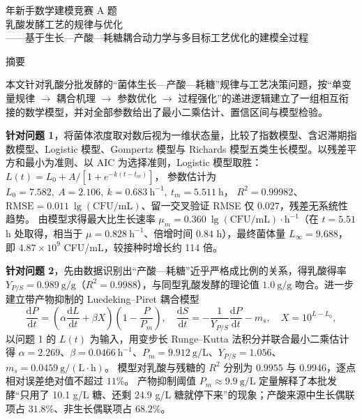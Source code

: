 \documentclass[12pt,a4paper]{ctexart}
\newcommand{\wj}[1]{\textbf{#1}}
\newcommand{\dd}{\mathrm{d}}
\begin{document}
\begin{center}
{ 年新手数学建模竞赛 \quad A 题}\\[0.5em]
{\heiti 乳酸发酵工艺的规律与优化}\\[0.6em]
{ ——基于生长—产酸—耗糖耦合动力学与多目标工艺优化的建模全过程}
\end{center}

\vspace{0.3em}

\begin{center}\heiti 摘\quad 要\end{center}

本文针对乳酸分批发酵的“菌体生长—产酸—耗糖”规律与工艺决策问题，按“单变量规律 $\to$ 耦合机理 $\to$ 参数优化 $\to$ 过程强化”的递进逻辑建立了一组相互衔接的数学模型，并对全部参数给出了最小二乘估计、置信区间与模型检验。

\wj{针对问题 1}，将菌体浓度取对数后视为一维状态量，比较了指数模型、含迟滞期指数模型、Logistic 模型、Gompertz 模型与 Richards 模型五类生长模型。以残差平方和最小为准则、以 AIC 为选择准则，Logistic 模型取胜：
$L(t)=L_0+A/[1+e^{-k(t-t_m)}]$，
参数估计为 $L_0=7.582,\ A=2.106,\ k=0.683\ \mathrm{h^{-1}},\ t_m=5.511\ \mathrm{h}$，
$R^2=0.99982$、$\mathrm{RMSE}=0.011\ \lg(\mathrm{CFU/mL})$、留一交叉验证 RMSE 仅 $0.027$，残差无系统性趋势。
由模型求得最大比生长速率 $\mu_m=0.360\ \lg(\mathrm{CFU/mL})\cdot\mathrm{h^{-1}}$（在 $t=5.51$ h 处取得，相当于 $\mu=0.828\ \mathrm{h^{-1}}$、倍增时间 $0.84$ h），最终菌体量 $L_\infty=9.688$，即 $4.87\times10^{9}$ CFU/mL，较接种时增长约 114 倍。

\wj{针对问题 2}，先由数据识别出“产酸—耗糖”近乎严格成比例的关系，得乳酸得率 $Y_{P/S}=0.989\ \mathrm{g/g}$（$R^2=0.9988$），与同型乳酸发酵的理论值 $1.0\ \mathrm{g/g}$ 吻合。进一步建立带产物抑制的 Luedeking--Piret 耦合模型
$$\frac{\dd P}{\dd t}=\left(\alpha\frac{\dd L}{\dd t}+\beta X\right)\left(1-\frac{P}{P_m}\right),\quad
\frac{\dd S}{\dd t}=-\frac{1}{Y_{P/S}}\frac{\dd P}{\dd t}-m_s,\quad X=10^{L-L_0},$$
以问题 1 的 $L(t)$ 为输入，用变步长 Runge--Kutta 法积分并联合最小二乘估计得
$\alpha=2.269$、$\beta=0.0466\ \mathrm{h^{-1}}$、$P_m=9.912\ \mathrm{g/L}$、$Y_{P/S}=1.056$、$m_s=0.0459\ \mathrm{g/(L\cdot h)}$。
模型对乳酸与残糖的 $R^2$ 分别为 $0.9955$ 与 $0.9946$，逐点相对误差绝对值不超过 $11\%$。
产物抑制阈值 $P_m\approx9.9\ \mathrm{g/L}$ 定量解释了本批发酵“只用了 10.1 g/L 糖、还剩 24.9 g/L 糖就停下来”的现象；产酸来源中生长偶联项占 $31.8\%$、非生长偶联项占 $68.2\%$。
\end{document}
